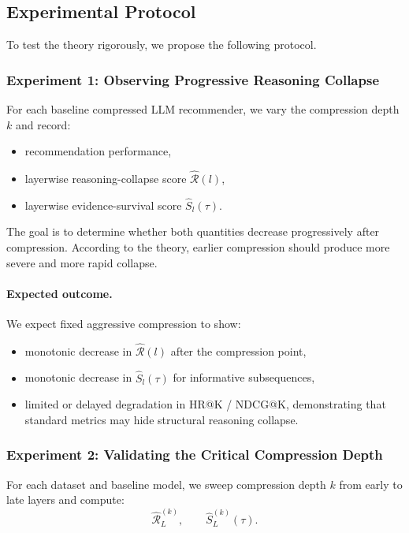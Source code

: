 \documentclass[11pt]{article}
\begin{document}
\subsection{Experimental Protocol}

To test the theory rigorously, we propose the following protocol.

\subsubsection{Experiment 1: Observing Progressive Reasoning Collapse}

For each baseline compressed LLM recommender, we vary the compression depth $k$ and record:
\begin{itemize}
    \item recommendation performance,
    \item layerwise reasoning-collapse score $\widehat{\mathcal{R}}(l)$,
    \item layerwise evidence-survival score $\widehat{S}_l(\tau)$.
\end{itemize}

The goal is to determine whether both quantities decrease progressively after compression. According to the theory, earlier compression should produce more severe and more rapid collapse.

\paragraph{Expected outcome.}
We expect fixed aggressive compression to show:
\begin{itemize}
    \item monotonic decrease in $\widehat{\mathcal{R}}(l)$ after the compression point,
    \item monotonic decrease in $\widehat{S}_l(\tau)$ for informative subsequences,
    \item limited or delayed degradation in HR@K / NDCG@K, demonstrating that standard metrics may hide structural reasoning collapse.
\end{itemize}

\subsubsection{Experiment 2: Validating the Critical Compression Depth}

For each dataset and baseline model, we sweep compression depth $k$ from early to late layers and compute:
\[
\widehat{\mathcal{R}}_L^{(k)}, \qquad \widehat{S}_L^{(k)}(\tau).
\]
\end{document}
